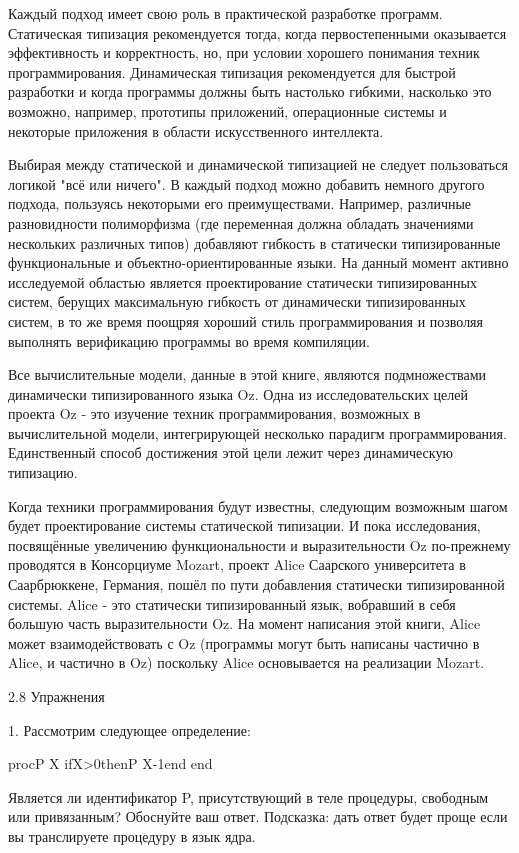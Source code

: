 Каждый подход имеет свою роль в практической разработке программ. Статическая типизация рекомендуется тогда, когда первостепенными оказывается эффективность и корректность, но, при условии хорошего понимания техник программирования. Динамическая типизация рекомендуется для быстрой разработки и когда программы должны быть настолько гибкими, насколько это возможно, например, прототипы приложений, операционные системы и некоторые приложения в области искусственного интеллекта.

Выбирая между статической и динамической типизацией не следует пользоваться логикой "всё или ничего". В каждый подход можно добавить немного другого подхода, пользуясь некоторыми его преимуществами. Например, различные разновидности полиморфизма (где переменная должна обладать значениями нескольких различных типов) добавляют гибкость в статически типизированные функциональные и объектно-ориентированные языки. На данный момент активно исследуемой областью является проектирование статически типизированных систем, берущих максимальную гибкость от динамически типизированных систем, в то же время поощряя хороший стиль программирования и позволяя выполнять верификацию программы во время компиляции.

Все вычислительные модели, данные в этой книге, являются подмножествами динамически типизированного языка Oz. Одна из исследовательских целей проекта Oz - это изучение техник программирования, возможных в вычислительной модели, интегрирующей несколько парадигм программирования. Единственный способ достижения этой цели лежит через динамическую типизацию.

Когда техники программирования будут известны, следующим возможным шагом будет проектирование системы статической типизации. И пока исследования, посвящённые увеличению функциональности и выразительности Oz по-прежнему проводятся в Консорциуме Mozart, проект Alice Саарского университета в Саарбрюккене, Германия, пошёл по пути добавления статически типизированной системы. Alice - это статически типизированный язык, вобравший в себя большую часть выразительности Oz. На момент написания этой книги, Alice может взаимодействовать с Oz (программы могут быть написаны частично в Alice, и частично в Oz) поскольку Alice основывается на реализации Mozart.

2.8 Упражнения

1. Рассмотрим следующее определение:

proc{P X}
ifX>0then{P X-1}end
end

Является ли идентификатор P, присутствующий в теле процедуры, свободным или привязанным? Обоснуйте ваш ответ. Подсказка: дать ответ будет проще если вы транслируете процедуру в язык ядра.


